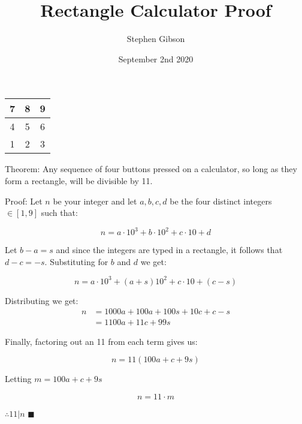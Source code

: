 \documentclass[letterpaper, 10pt]{article}
\title{Rectangle Calculator Proof}
\author{Stephen Gibson}
\date{September 2nd 2020}
\begin{document}
\maketitle

\begin{center}
\begin{tabular}{|c|c|c|}
\hline
7 & 8 & 9\\
\hline
4 & 5 & 6\\
\hline
1 & 2 & 3\\
\hline
\end{tabular}
\end{center}

\vspace{20pt}

Theorem: Any sequence of four buttons pressed on a calculator, so long as they form a rectangle, will be divisible by 11.

\vspace{30pt}

Proof: Let $n$ be your integer and let $a, b, c, d$ be the four distinct integers $\in [1, 9]$ such that:

\begin{equation*}
n = a \cdot 10^3 + b \cdot 10^2 + c \cdot 10 + d
\end{equation*}

Let $b - a = s$ and since the integers are typed in a rectangle, it follows that $d - c = -s$. Substituting for $b$ and $d$ we get:

\begin{equation*}
n = a \cdot 10^3 + (a + s)10^2 + c \cdot 10 + (c - s)
\end{equation*}

Distributing we get:
\begin{align*}
n &= 1000a + 100a + 100s + 10c + c - s\\
&= 1100a + 11c + 99s
\end{align*}

Finally, factoring out an 11 from each term gives us:

\begin{equation*}
n = 11(100a + c + 9s)
\end{equation*}

Letting $m = 100a + c + 9s$

\begin{equation*}
n = 11 \cdot m
\end{equation*}

$\therefore 11|n$ $\blacksquare$
\end{document}
